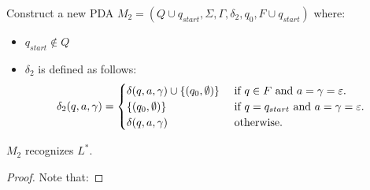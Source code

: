 \begin{problem}
\begin{enumalph}
\begin{Answer}
        \step
        Construct a new PDA $M_2 = (Q \cup q_{start}, \Sigma, \Gamma, \delta_2, q_0, F \cup q_{start})$ where:
        \begin{itemize}
          \item $q_{start} \notin Q$
          \item $\delta_2$ is defined as follows:
            \begin{align*}
              \delta_2(q, a, \gamma) = 
              \begin{cases}
                \delta(q, a, \gamma) \cup \left\{(q_0, \emptyset)\right\} & \text{ if $q \in F$ and $a = \gamma = \varepsilon$. } \\
                \left\{(q_0, \emptyset)\right\} & \text{ if $q = q_{start}$ and $a = \gamma = \varepsilon$. } \\
                \delta(q, a, \gamma) & \text{ otherwise. } \\
              \end{cases} 
            \end{align*}
          \end{itemize}
          \begin{claim}
            $M_2$ recognizes $L^*$.
            \begin{proof}
              Note that:


\end{proof}
\end{claim}
\end{Answer}
\end{enumalph}
\end{problem}
